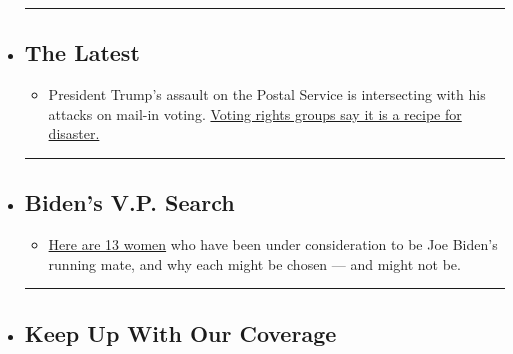 \begin{itemize}
\item
  \begin{center}\rule{0.5\linewidth}{\linethickness}\end{center}

  \hypertarget{the-latest}{%
  \subsection{The Latest}\label{the-latest}}

  \begin{itemize}
  \tightlist
  \item
    President Trump's assault on the Postal Service is intersecting with
    his attacks on mail-in voting.
    \href{https://www.nytimes3xbfgragh.onion/2020/07/31/us/politics/trump-usps-mail-delays.html?action=click\&pgtype=Article\&state=default\&region=BELOW_MAIN_CONTENT\&context=storylines_guide}{Voting
    rights groups say it is a recipe for disaster.}
  \end{itemize}
\item
  \begin{center}\rule{0.5\linewidth}{\linethickness}\end{center}

  \hypertarget{bidens-vp-search}{%
  \subsection{Biden's V.P. Search}\label{bidens-vp-search}}

  \begin{itemize}
  \tightlist
  \item
    \href{https://www.nytimes3xbfgragh.onion/article/biden-vice-president-2020.html?action=click\&pgtype=Article\&state=default\&region=BELOW_MAIN_CONTENT\&context=storylines_guide}{Here
    are 13 women} who have been under consideration to be Joe Biden's
    running mate, and why each might be chosen --- and might not be.
  \end{itemize}
\item
  \begin{center}\rule{0.5\linewidth}{\linethickness}\end{center}

  \hypertarget{keep-up-with-our-coverage}{%
  \subsection{Keep Up With Our
  Coverage}\label{keep-up-with-our-coverage}}


\end{itemize}
